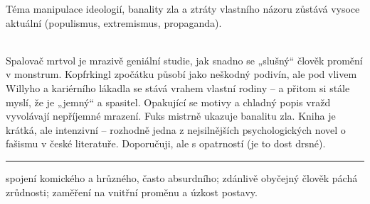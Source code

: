 \documentclass[FGBook.tex]{subfiles}
\begin{document}
\noindent Téma manipulace ideologií, banality zla a ztráty vlastního názoru zůstává vysoce aktuální (populismus, extremismus, propaganda).

\vspace*{2em}\\
\noindent Spalovač mrtvol je mrazivě geniální studie, jak snadno se „slušný“ člověk promění v monstrum. Kopfrkingl zpočátku působí jako neškodný podivín, ale pod vlivem Willyho a kariérního lákadla se stává vrahem vlastní rodiny – a přitom si stále myslí, že je „jemný“ a spasitel. Opakující se motivy a chladný popis vražd vyvolávají nepříjemné mrazení. Fuks mistrně ukazuje banalitu zla. Kniha je krátká, ale intenzivní – rozhodně jedna z nejsilnějších psychologických novel o fašismu v české literatuře. Doporučuji, ale s opatrností (je to dost drsné).

\vfill

\noindent\begin{minipage}{\textwidth}
    {\textcolor{\wpagecolor}{\rule{\linewidth}{0.4pt}}
    \footnotesize
     spojení komického a hrůzného, často absurdního; 
     zdánlivě obyčejný člověk páchá zrůdnosti; 
     zaměření na vnitřní proměnu a úzkost postavy.
    }
\end{minipage}

\newpage
\end{document}
